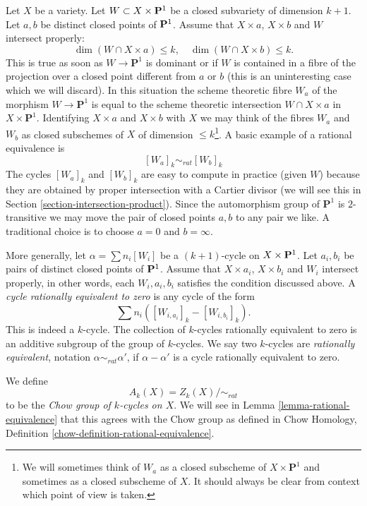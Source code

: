 \medskip\noindent
Let $X$ be a variety. Let $W \subset X \times {\bf P}^1$
be a closed subvariety of dimension $k + 1$. Let $a, b$ be distinct closed
points of ${\bf P}^1$. Assume that $X \times a$, $X \times b$ and $W$
intersect properly:
$$
\dim (W \cap X \times a) \leq k,\quad
\dim (W \cap X \times b) \leq k.
$$
This is true as soon as $W \to \mathbf{P}^1$ is dominant or if $W$ is
contained in a fibre of the projection over a closed point different from
$a$ or $b$ (this is an uninteresting case which we will discard). In this
situation the scheme theoretic fibre $W_a$ of the morphism
$W \to \mathbf{P}^1$ is equal to the scheme theoretic intersection
$W \cap X \times a$ in $X \times \mathbf{P}^1$. Identifying $X \times a$
and $X \times b$ with $X$ we may think of the fibres $W_a$ and $W_b$
as closed subschemes of $X$ of dimension $\leq k$\footnote{We will sometimes
think of $W_a$ as a closed subscheme of $X \times \mathbf{P}^1$ and sometimes
as a closed subscheme of $X$. It should always be clear from context which
point of view is taken.}. A basic example of a
rational equivalence is
$$
[W_a]_k \sim_{rat} [W_b]_k
$$
The cycles $[W_a]_k$ and $[W_b]_k$ are easy to compute in practice
(given $W$) because they are obtained by proper intersection with
a Cartier divisor (we will see this in
Section \ref{section-intersection-product}).
Since the automorphism group of $\mathbf{P}^1$ is $2$-transitive we may
move the pair of closed points $a, b$ to any pair we like. A traditional
choice is to choose $a = 0$ and $b = \infty$.

\medskip\noindent
More generally, let $\alpha = \sum n_i [W_i]$ be a $(k + 1)$-cycle on
$X \times {\bf P}^1$.  Let $a_i, b_i$ be pairs of distinct closed points of
${\bf P}^1$. Assume that $X \times a_i$, $X \times b_i$ and $W_i$ intersect
properly, in other words, each $W_i, a_i, b_i$ satisfies the condition
discussed above. A {\it cycle rationally equivalent to zero} is any cycle
of the form
$$
\sum n_i([W_{i, a_i}]_k - [W_{i, b_i}]_k).
$$
This is indeed a $k$-cycle. The collection of $k$-cycles rationally
equivalent to zero is an additive subgroup of the group of $k$-cycles.
We say two $k$-cycles are {\it rationally equivalent}, notation
$\alpha \sim_{rat} \alpha'$, if $\alpha - \alpha'$ is a cycle rationally
equivalent to zero.

\medskip\noindent
We define
$$
A_k(X) = Z_k(X)/ \sim_{rat}
$$
to be the {\it Chow group of $k$-cycles on $X$}. We will see in
Lemma \ref{lemma-rational-equivalence}
that this agrees with the Chow group as defined in
Chow Homology, Definition \ref{chow-definition-rational-equivalence}.


